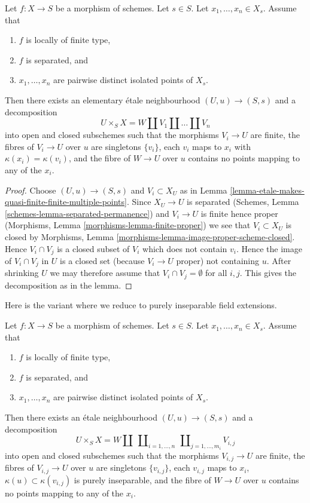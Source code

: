 \begin{lemma}
\label{lemma-etale-splits-off-quasi-finite-part-technical}
Let $f : X \to S$ be a morphism of schemes.
Let $s \in S$. Let $x_1, \ldots, x_n \in X_s$. Assume that
\begin{enumerate}
\item $f$ is locally of finite type,
\item $f$ is separated, and
\item $x_1, \ldots, x_n$ are pairwise distinct isolated points of $X_s$.
\end{enumerate}
Then there exists an elementary \'etale neighbourhood $(U, u) \to (S, s)$
and a decomposition
$$
U \times_S X = W \amalg V_1 \amalg \ldots \amalg V_n
$$
into open and closed subschemes such that the morphisms
$V_i \to U$ are finite, the fibres of $V_i \to U$ over $u$ are
singletons $\{v_i\}$, each $v_i$ maps to $x_i$ with
$\kappa(x_i) = \kappa(v_i)$, and the fibre of $W \to U$
over $u$ contains no points mapping to any of the $x_i$.
\end{lemma}

\begin{proof}
Choose $(U, u) \to (S, s)$ and $V_i \subset X_U$ as in
Lemma \ref{lemma-etale-makes-quasi-finite-finite-multiple-points}.
Since $X_U \to U$ is separated
(Schemes, Lemma \ref{schemes-lemma-separated-permanence})
and $V_i \to U$ is finite hence proper
(Morphisms, Lemma \ref{morphisms-lemma-finite-proper})
we see that $V_i \subset X_U$ is closed by
Morphisms, Lemma \ref{morphisms-lemma-image-proper-scheme-closed}.
Hence $V_i \cap V_j$ is a closed subset of $V_i$ which
does not contain $v_i$. Hence the image of $V_i \cap V_j$
in $U$ is a closed set (because $V_i \to U$ proper) not
containing $u$. After shrinking $U$ we may therefore assume
that $V_i \cap V_j = \emptyset$ for all $i, j$. This gives the
decomposition as in the lemma.
\end{proof}

\noindent
Here is the variant where we reduce to purely inseparable
field extensions.

\begin{lemma}
\label{lemma-etale-splits-off-quasi-finite-part-technical-variant}
Let $f : X \to S$ be a morphism of schemes.
Let $s \in S$. Let $x_1, \ldots, x_n \in X_s$. Assume that
\begin{enumerate}
\item $f$ is locally of finite type,
\item $f$ is separated, and
\item $x_1, \ldots, x_n$ are pairwise distinct isolated points of $X_s$.
\end{enumerate}
Then there exists an \'etale neighbourhood $(U, u) \to (S, s)$
and a decomposition
$$
U \times_S X =
W \amalg
\ \coprod\nolimits_{i = 1, \ldots, n}
\ \coprod\nolimits_{j = 1, \ldots, m_i}
V_{i, j}
$$
into open and closed subschemes such that the morphisms
$V_{i, j} \to U$ are finite, the fibres of $V_{i, j} \to U$ over $u$ are
singletons $\{v_{i, j}\}$, each $v_{i, j}$ maps to $x_i$,
$\kappa(u) \subset \kappa(v_{i, j})$ is purely inseparable,
and the fibre of $W \to U$ over $u$ contains no points mapping
to any of the $x_i$.
\end{lemma}


